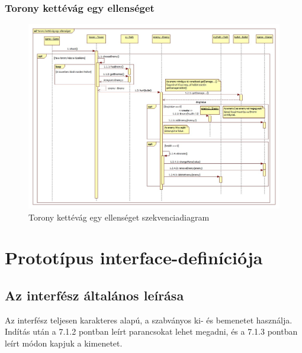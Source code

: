 \subsubsection{Torony kettévág egy ellenséget}
\begin{figure}[H]
\begin{center}
\includegraphics[width=17cm]{chapters/chapter07/images/sd_torony_kettevag_egy_ellenseget.jpg}
\caption{Torony kettévág egy ellenséget szekvenciadiagram}
\label{fig:Torony_kettevag_egy_ellenseget}
\end{center}
\end{figure}



\section{Prototípus interface-definíciója}


\lstset{escapeinside=`', xleftmargin=10pt, frame=single, basicstyle=\ttfamily\footnotesize, language=sh}


\subsection{Az interfész általános leírása}
Az interfész teljesen karakteres alapú, a szabványos ki- és bemenetet használja. Indítás után a 7.1.2 pontban leírt parancsokat lehet megadni, és a 7.1.3 pontban leírt módon kapjuk a kimenetet. 

